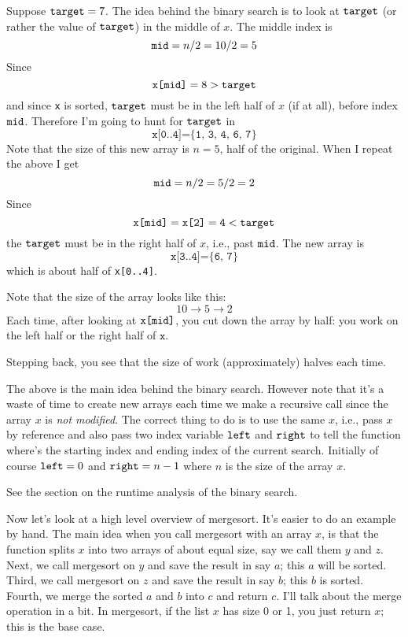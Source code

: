 Suppose $\texttt{target} = 7$.
The idea behind the binary search is to look at 
$\texttt{target}$ (or rather the value of $\texttt{target}$) in the 
middle of $x$.
The middle index is
\[
\texttt{mid} = n/2 = 10/2 = 5
\]
Since 
\[
\texttt{x[\texttt{mid}]} = 8 > \texttt{target}
\]
and since \verb!x! is sorted, $\texttt{target}$ must be in the left half
of $x$ (if at all), before index $\texttt{mid}$.
Therefore I'm going to hunt for $\texttt{target}$ in 
\[
\texttt{x[0..4]} = \texttt{\{1, 3, 4, 6, 7\}}
\]
Note that the size of this new array is $n = 5$, half of the original.
When I repeat the above I get
\[
\texttt{mid} = n/2 = 5/2 = 2
\]
Since 
\[
\texttt{x[\texttt{mid}]} = \texttt{x[2]} = \texttt{4} < \texttt{target}
\]
the $\texttt{target}$ must be in the right half of $x$, i.e., 
past $\texttt{mid}$.
The new array is
\[
\texttt{x[3..4]} = \texttt{\{6, 7\}}
\]
which is about half of \verb!x[0..4]!.

Note that the size of the array looks like this:
\[
10 \rightarrow 5 \rightarrow 2
\]
Each time, after looking at $\texttt{x[\texttt{mid}]}$,
you cut down the array by half: you work on the left half or the right half
of $\texttt{x}$.

Stepping back, you see that the size of work (approximately) halves each time.

The above is the main idea behind the binary search.
However note that it's a waste of time to create new arrays each time we
make a recursive call since the array $x$ is \textit{not modified}.
The correct thing to do is to use the same $x$, i.e.,
pass $x$ by reference and 
also pass two index variable $\texttt{left}$ and $\texttt{right}$
to tell the function where's the starting index and ending index
of the current search.
Initially of course $\texttt{left} = 0$ and $\texttt{right} = n - 1$
where $n$ is the size of the array $x$.

See the section on the runtime analysis of the binary search.




Now let's look at a high level overview of mergesort.
It's easier to do an example by hand.
The main idea when you call mergesort with an array $x$, is that
the function splits $x$ into two arrays of about equal size,
say we call them $y$ and $z$.
Next, we call mergesort on $y$ and save the result in say $a$;
this $a$ will be sorted.
Third, we call mergesort on $z$ and save the result in say $b$;
this $b$ is sorted.
Fourth, we merge the sorted $a$ and $b$ into $c$ and return $c$.
I'll talk about the merge operation in a bit.
In mergesort, if the list $x$ has size 0 or 1, you just return $x$;
this is the base case.

